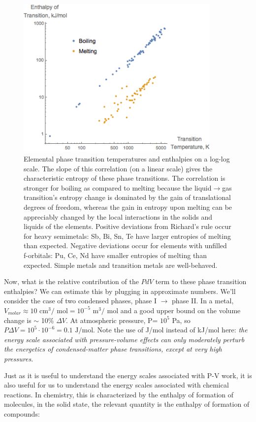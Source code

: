 \documentclass[12pt]{article}
\begin{document}
\begin{figure}[h]
\centering
\includegraphics[width = 10cm]{Trouton_and_Richards_rules.png}
\caption{Elemental phase transition temperatures and enthalpies on a log-log scale. The slope of this correlation (on a linear scale) gives the characteristic entropy of these phase transitions. The correlation is stronger for boiling as compared to melting because the liquid$\to$gas transition's entropy change is dominated by the gain of translational degrees of freedom, whereas the gain in entropy upon melting can be appreciably changed by the local interactions in the solids and liquids of the elements. Positive deviations from Richard's rule occur for heavy semimetals: Sb, Bi, Sn, Te have larger entropies of melting than expected. Negative deviations occur for elements with unfilled f-orbitals: Pu, Ce, Nd have smaller entropies of melting than expected. Simple metals and transition metals are well-behaved.}
\label{Trouton_Richard}
\end{figure}

Now, what is the relative contribution of the $PdV$ term to these phase transition enthalpies?  We can estimate this by plugging in approximate numbers. We'll consider the case of two condensed phases, phase I $\rightarrow$ phase II.  In a metal, $V_{molar} \approx 10 \text{ cm}^3\text{/ mol}=10^{-5} \text{ m}^3\text{/ mol}$ and a good upper bound on the volume change is $\sim$ 10\% $\Delta V$.  At atmospheric pressure, P\degree = $10^5$ Pa, so $P \Delta V = 10^5 \cdot 10^{-6} = 0.1 \text{ J/mol}$. Note the use of J/mol instead of kJ/mol here: \emph{the energy scale associated with pressure-volume effects can only moderately perturb the energetics of condensed-matter phase transitions, except at very high pressures}.

Just as it is useful to understand the energy scales associated with P-V work, it is also useful for us to understand the energy scales associated with chemical reactions. In chemistry, this is characterized by the enthalpy of formation of molecules, in the solid state, the relevant quantity is the enthalpy of formation of compounds:\\
\end{document}
